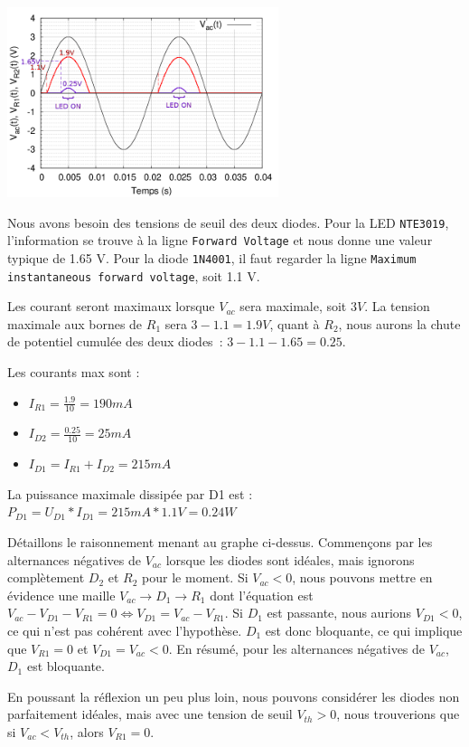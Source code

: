 \documentclass{../../template/tp}
\begin{document}
{%
\begin{center} \includegraphics[width=300px]{image2corr.png} \end{center}
Nous avons besoin des tensions de seuil des deux diodes.
Pour la LED \texttt{NTE3019}, l'information se trouve à la ligne \texttt{Forward Voltage} et nous donne une valeur typique de 1.65 V.
Pour la diode \texttt{1N4001}, il faut regarder la ligne \texttt{Maximum instantaneous forward voltage}, soit 1.1 V.

Les courant seront maximaux lorsque $V_{ac}$ sera maximale, soit $3 V$.
La tension maximale aux bornes de $R_1$ sera $3 - 1.1 = 1.9 V$, quant à $R_2$, nous aurons la chute de potentiel cumulée des deux diodes~: $3 - 1.1 - 1.65 = 0.25$.

Les courants max sont :
\begin{itemize}
    \item $I_{R1} = \frac{1.9}{10} = 190mA$
    \item $I_{D2} = \frac{0.25}{10} = 25mA$
    \item $I_{D1} = I_{R1} + I_{D2} = 215mA$
\end{itemize}
La puissance maximale dissipée par D1 est : $P_{D1} = U_{D1}*I_{D1} = 215mA*1.1V = 0.24W$


Détaillons le raisonnement menant au graphe ci-dessus.
Commençons par les alternances négatives de $V_{ac}$ lorsque les diodes sont idéales, mais ignorons complètement $D_2$ et $R_2$ pour le moment.
Si $V_{ac} < 0$, nous pouvons mettre en évidence une maille $V_{ac} \rightarrow D_1 \rightarrow R_1$ dont l'équation est $V_{ac} - V_{D1} - V_{R1} = 0 \Leftrightarrow V_{D1} = V_{ac} - V_{R1}$. Si $D_1$ est passante, nous aurions $V_{D1} < 0$, ce qui n'est pas cohérent avec l'hypothèse.
$D_1$ est donc bloquante, ce qui implique que $V_{R1} = 0$ et $V_{D1} = V_{ac} < 0$.
En résumé, pour les alternances négatives de $V_{ac}$, $D_1$ est bloquante.

En poussant la réflexion un peu plus loin, nous pouvons considérer les diodes non parfaitement idéales, mais avec une tension de seuil $V_{th} > 0$, nous trouverions que si $V_{ac} < V_{th}$, alors $V_{R1} = 0$.

}
\end{document}

